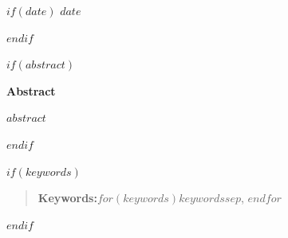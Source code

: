 \begin{titlepage}
            \begin{center}

                \vspace{2.5em}

                $if(date)$
                $date$\par
                $endif$

            \end{center}

            \vspace{1em}


        $if(abstract)$
            \begin{center}{\textbf{Abstract}}\end{center}
            \vspace{0.4em}
            {\small\noindent $abstract$\par}
            \vspace{1em}
        $endif$

            \vspace{1em}


        $if(keywords)$
            \begin{quote}\small\noindent\textbf{Keywords:}\enspace $for(keywords)$$keywords$$sep$, $endfor$\end{quote}
        $endif$

    \vspace{1em}

\end{titlepage}

\clearpage